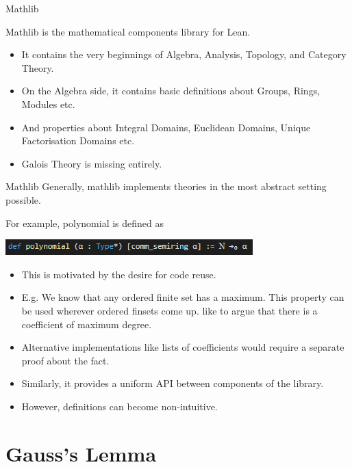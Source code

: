 \documentclass{beamer}
\begin{document}
\begin{frame}{Mathlib}

  Mathlib is the mathematical components library for Lean. 
  \begin{itemize}
    \item It contains the very beginnings of Algebra, Analysis, Topology, and Category Theory. 
    \item On the Algebra side, it contains basic definitions about Groups, Rings, Modules etc. 
    \item And properties about Integral Domains, Euclidean Domains, Unique Factorisation Domains etc. 
    \item Galois Theory is missing entirely.  
  \end{itemize}


\end{frame}

\begin{frame}{Mathlib}
  Generally, mathlib implements theories in the most abstract setting possible. 

  For example, polynomial is defined as

  \includegraphics{polynomial.png}

  \begin{itemize}
    \item  This is motivated by the desire for code reuse. 
    \item E.g. We know that any ordered finite set has a maximum. This property can be used wherever ordered finsets come up. 
          like to argue that there is a coefficient of maximum degree. 
    \item Alternative implementations like lists of coefficients would require a separate proof about the fact. 
    \item Similarly, it provides a uniform API between components of the library. 
    \item However, definitions can become non-intuitive.
  \end{itemize}
\end{frame}

\section {Gauss's Lemma}
\end{document}
